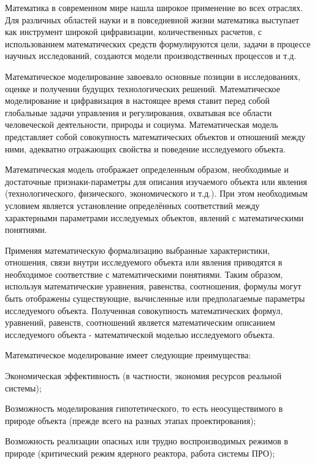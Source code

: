 
Математика в современном мире нашла широкое применение во всех отраслях. Для различных областей науки и в повседневной жизни математика выступает как инструмент широкой цифравизации, количественных расчетов, с использованием математических средств формулируются цели, задачи в процессе научных исследований, создаются модели производственных процессов и т.д.


Математическое моделирование завоевало основные позиции в исследованиях, оценке и получении будущих технологических решений. Математическое моделирование и цифравизация в настоящее время ставит перед собой глобальные задачи управления и регулирования, охватывая все области человеческой деятельности, природы и социума.
Математическая модель представляет собой совокупность математических объектов и отношений между ними, адекватно отражающих свойства и поведение исследуемого объекта.


Математическая модель отображает определенным образом, необходимые и достаточные признаки-параметры для описания изучаемого объекта или явления (технологического, физического, экономического и т.д.). При этом необходимым условием является установление определённых соответствий между характерными параметрами исследуемых объектов, явлений с математическими понятиями. 


Применяя математическую формализацию выбранные характеристики, отношения, связи внутри исследуемого объекта или явления приводятся в необходимое соответствие с математическими понятиями. Таким образом, используя математические уравнения, равенства, соотношения, формулы могут быть отображены существующие, вычисленные или предполагаемые параметры исследуемого объекта. Полученная совокупность математических формул, уравнений, равенств, соотношений является математическим описанием исследуемого объекта -  математической моделью исследуемого объекта. \cite{b2} 


 Математическое моделирование имеет следующие преимущества: 
 
 
Экономическая эффективность (в частности, экономия ресурсов реальной системы);

Возможность моделирования гипотетического, то есть неосуществимого в природе объекта (прежде всего на разных этапах проектирования);


Возможность реализации опасных или трудно воспроизводимых режимов в природе (критический режим ядерного реактора, работа системы ПРО);


